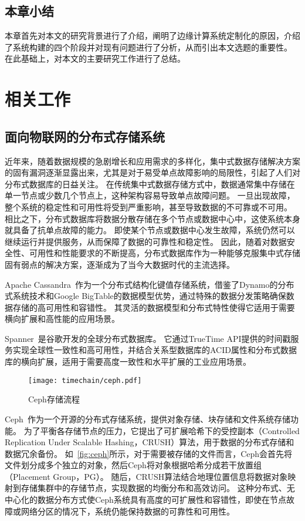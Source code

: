 \section{本章小结}
本章首先对本文的研究背景进行了介绍，阐明了边缘计算系统定制化的原因，介绍了系统构建的四个阶段并对现有问题进行了分析，从而引出本文选题的重要性。
在此基础上，对本文的主要研究工作进行了总结。

\chapter{相关工作}
\section{面向物联网的分布式存储系统}
近年来，随着数据规模的急剧增长和应用需求的多样化，集中式数据存储解决方案的固有漏洞逐渐显露出来，尤其是对于易受单点故障影响的局限性，引起了人们对分布式数据库的日益关注。
在传统集中式数据存储方式中，数据通常集中存储在单一节点或少数几个节点上，这种架构容易导致单点故障问题。
一旦出现故障，整个系统的稳定性和可用性将受到严重影响，甚至导致数据的不可靠或不可用。
相比之下，分布式数据库将数据分散存储在多个节点或数据中心中，这使系统本身就具备了抗单点故障的能力。
即使某个节点或数据中心发生故障，系统仍然可以继续运行并提供服务，从而保障了数据的可靠性和稳定性。
因此，随着对数据安全性、可用性和性能要求的不断提高，分布式数据库作为一种能够克服集中式存储固有弱点的解决方案，逐渐成为了当今大数据时代的主流选择。

Apache Cassandra~\cite{lakshman2010cassandra}作为一个分布式结构化键值存储系统，借鉴了Dynamo的分布式系统技术和Google BigTable的数据模型优势，通过特殊的数据分发策略确保数据存储的高可用性和容错性。
其灵活的数据模型和分布式特性使得它适用于需要横向扩展和高性能的应用场景。

Spanner~\cite{corbett2013spanner}是谷歌开发的全球分布式数据库。
它通过TrueTime API提供的时间戳服务实现全球性一致性和高可用性，并结合关系型数据库的ACID属性和分布式数据库的横向扩展，适用于需要高度一致性和水平扩展的工业应用场景。

\begin{figure}[t]
    \centering
    \texttt{[image: timechain/ceph.pdf]}
    \caption{Ceph存储流程}
    \label{fig:ceph}
\end{figure}

Ceph~\cite{weil2006ceph}作为一个开源的分布式存储系统，提供对象存储、块存储和文件系统存储功能。
为了平衡各存储节点的压力，它提出了可扩展哈希下的受控副本（Controlled Replication Under Scalable Hashing，CRUSH）算法，用于数据的分布式存储和数据冗余备份。
如~\autoref{fig:ceph}所示，对于需要被存储的文件而言，Ceph会首先将文件划分成多个独立的对象，然后Ceph将对象根据哈希分成若干放置组（Placement Group，PG）。
随后，CRUSH算法结合地理位置信息将数据对象映射到存储集群中的存储节点，实现数据的均衡分布和高效访问。
这种分布式、无中心化的数据分布方式使Ceph系统具有高度的可扩展性和容错性，即使在节点故障或网络分区的情况下，系统仍能保持数据的可靠性和可用性。

